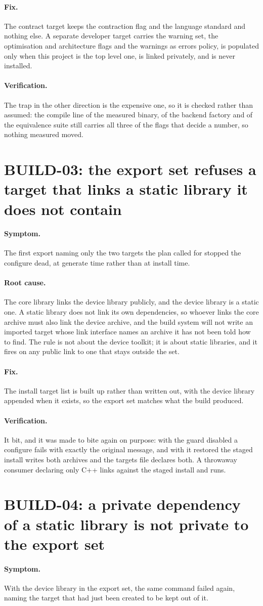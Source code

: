 \documentclass[11pt,a4paper]{report}
\newcommand{\symptom}[1]{\paragraph{Symptom.}#1}
\newcommand{\rootcause}[1]{\paragraph{Root cause.}#1}
\newcommand{\fix}[1]{\paragraph{Fix.}#1}
\newcommand{\verification}[1]{\paragraph{Verification.}#1}
\begin{document}
\fix{The contract target keeps the contraction flag and the language standard and
nothing else. A separate developer target carries the warning set, the
optimisation and architecture flags and the warnings as errors policy, is
populated only when this project is the top level one, is linked privately, and
is never installed.}

\verification{The trap in the other direction is the expensive one, so it is
checked rather than assumed: the compile line of the measured binary, of the
backend factory and of the equivalence suite still carries all three of the flags
that decide a number, so nothing measured moved.}

\section{BUILD-03: the export set refuses a target that links a static library it does not contain}

\symptom{The first export naming only the two targets the plan called for stopped
the configure dead, at generate time rather than at install time.}

\rootcause{The core library links the device library publicly, and the device
library is a static one. A static library does not link its own dependencies, so
whoever links the core archive must also link the device archive, and the build
system will not write an imported target whose link interface names an archive it
has not been told how to find. The rule is not about the device toolkit; it is
about static libraries, and it fires on any public link to one that stays outside
the set.}

\fix{The install target list is built up rather than written out, with the device
library appended when it exists, so the export set matches what the build
produced.}

\verification{It bit, and it was made to bite again on purpose: with the guard
disabled a configure fails with exactly the original message, and with it
restored the staged install writes both archives and the targets file declares
both. A throwaway consumer declaring only C++ links against the staged install
and runs.}

\section{BUILD-04: a private dependency of a static library is not private to the export set}

\symptom{With the device library in the export set, the same command failed
again, naming the target that had just been created to be kept out of it.}
\end{document}
